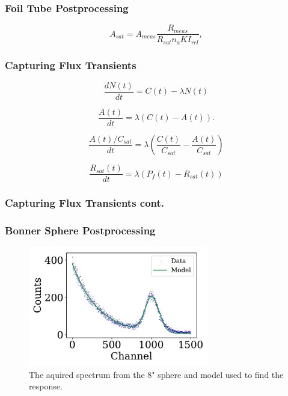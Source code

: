 \documentclass[fleqn]{beamer}
\begin{document}
\begin{frame}
\frametitle{Foil Tube Postprocessing}

\begin{equation}
\label{eqn:a_sat}
A_{sat} = A_{meas} \frac{R_{meas}}{R_{sat} n_a K I_{rel}} ,
\end{equation}

\end{frame}

\begin{frame}
\frametitle{Capturing Flux Transients}

\begin{equation}
\label{eqn:bateman}
\frac{dN(t)}{dt} = C(t) - \lambda N(t)
\end{equation}

\begin{equation}
\label{eqn:bateman_activity}
\frac{A(t)}{dt} = \lambda (C(t) - A(t)).
\end{equation}

\begin{equation}
\label{eqn:bateman_ratios}
\frac{A(t) / C_{sat}}{dt} = \lambda (\frac{C(t)}{C_{sat}} - \frac{A(t)}{C_{sat}})
\end{equation}

\begin{equation}
\label{eqn:bateman_r_sat}
\frac{R_{sat}(t)}{dt} = \lambda (P_{f}(t) - R_{sat}(t))
\end{equation}

\end{frame}

\begin{frame}
\frametitle{Capturing Flux Transients cont.}

\end{frame}

\begin{frame}
\frametitle{Bonner Sphere Postprocessing}

\begin{figure}
\centering
\includegraphics[width = 0.7\textwidth]{bs4_spectrum}
\caption{The aquired spectrum from the 8" sphere and model used to find the response.}
\end{figure}

\end{frame}
\end{document}
